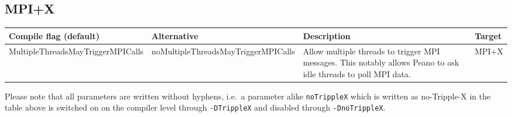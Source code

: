 \subsection*{MPI+X}





\begin{center}
 \begin{tabular}{p{2cm}p{2cm}p{8cm}l}
  Compile flag (default) & Alternative & Description & Target \\
  \hline
   {\footnotesize Multiple\-Threads\-May\-Trigger\-MPI\-Calls} 
   & 
   {\footnotesize noMultiple\-Threads\-May\-Trigger\-MPI\-Calls} 
   &
   Allow multiple threads to trigger MPI messages. This notably allows Peano to
   ask idle threads to poll MPI data.
   & MPI+X
  \\
  \hline
 \end{tabular}
\end{center}

%

\noindent
Please note that all parameters are written without hyphens, i.e.~a parameter
alike \texttt{noTrippleX} which is written as no-Tripple-X in the table above is
switched on on the compiler level through \texttt{-DTrippleX} and disabled
through \texttt{-DnoTrippleX}.




